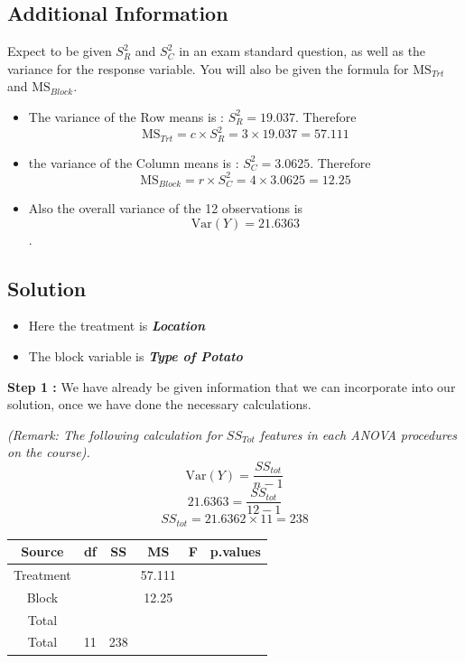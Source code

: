 \documentclass[]{article}
\begin{document}
\subsection*{Additional Information} 
\begin{framed}
\noindent Expect to be given $S^2_R$ and $S^2_C$ in an exam standard question, as well as the variance for the response variable. You will also be given the formula for $\textrm{MS}_{Trt}$ and $\textrm{MS}_{Block}$.
\end{framed}
\begin{itemize}
\item The variance of the Row means is : $S^2_{R} = 19.037$. Therefore 
	\[ \textrm{MS}_{Trt} = c \times S^2_{R} = 3 \times 19.037 = 57.111 \]
	
\item the variance of the Column means is : $S^2_{C} = 3.0625$.	Therefore 
	\[ \textrm{MS}_{Block} = r \times S^2_{C} = 4 \times 3.0625 = 12.25\]
	
\item Also the overall variance of the 12 observations is \[\textrm{Var}(Y) = 21.6363 \]. 
\end{itemize}
\newpage
\subsection{Solution}

\begin{itemize}
	\item Here the treatment is \textbf{\textit{Location}}
	\item The block variable is \textbf{\textit{Type of Potato}}
\end{itemize}

\noindent \textbf{Step 1 :} We have already be given information that we can incorporate into our solution, once we have done the necessary calculations.

\bigskip
\noindent \textit{(Remark: The following calculation for $SS_{Tot}$ features in each ANOVA procedures on the course).}
\[\textrm{Var}(Y) = \frac{ SS_{tot}}{n-1} \]
\[ 21.6363 = \frac{ SS_{tot}}{12-1} \]
\[ SS_{tot} = 21.6362 \times 11 = 238 \]
{
	\Large
	\begin{center}
\begin{tabular}{|c|c|c|c|c|c|}
\hline Source	       &	df	&	SS	&	MS	&	F	&	p.values	\\ \hline
Treatment      &		&		&	57.111	&		&		\\ \hline
Block	&		\phantom{spa}		&	\phantom{spa}		&	12.25	&		&		\\ \hline
Total	&		&		&		\phantom{spa}		&	\phantom{spa}		&		\\ \hline 
Total	&	11	&	238	&		&		&		\\ \hline  
\end{tabular}
\end{center}
}
\end{document}
